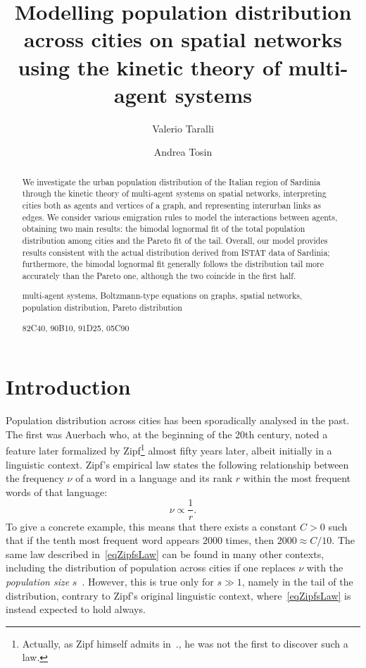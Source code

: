 \documentclass[a4paper]{article}
\title{Modelling population distribution across cities on spatial networks using the kinetic theory of multi-agent systems}
\author{Valerio Taralli}
\author{Andrea Tosin}
\affil{{\small Department of Mathematical Sciences ``G. L. Lagrange'', Politecnico di Torino, Italy}}
\date{}
\begin{document}
\maketitle
	
\begin{abstract}
We investigate the urban population distribution of the Italian region of Sardinia through the kinetic theory of multi-agent systems on spatial networks, interpreting cities both as agents and vertices of a graph, and representing interurban links as edges. We consider various emigration rules to model the interactions between agents, obtaining two main results: the bimodal lognormal fit of the total population distribution among cities and the Pareto fit of the tail. Overall, our model provides results consistent with the actual distribution derived from ISTAT data of Sardinia; furthermore, the bimodal lognormal fit generally follows the distribution tail more accurately than the Pareto one, although the two coincide in the first half.

\medskip

 multi-agent systems, Boltzmann-type equations on graphs, spatial networks, population distribution, Pareto distribution

\medskip

 82C40, 90B10, 91D25, 05C90
\end{abstract}

\section{Introduction}
\label{secIntroduction}
%
Population distribution across cities has been sporadically analysed in the past. The first was Auerbach \cite{Auerbach1913} who, at the beginning of the 20th century, noted a feature later formalized by Zipf\footnote{Actually, as Zipf himself admits in~\cite{Zipf2016}., he was not the first to discover such a law.} \cite{Zipf2016} almost fifty years later, albeit initially in a linguistic context. Zipf's empirical law states the following relationship between the frequency $\nu$ of a word in a language and its rank $r$ within the most frequent words of that language:
\begin{equation}
    \nu\propto\frac{1}{r}.
    \label{eqZipfsLaw}
\end{equation}
To give a concrete example, this means that there exists a constant $C>0$ such that if the tenth most frequent word appears $2000$ times, then $2000\approx C/10$. The same law described in~\eqref{eqZipfsLaw} can be found in many other contexts, including the distribution of population across cities if one replaces $\nu$ with the \textit{population size} $s$~\cite[Fig. 9-2]{Zipf2016}. However, this is true only for $s\gg 1$, namely in the tail of the distribution, contrary to Zipf's original linguistic context, where~\eqref{eqZipfsLaw} is instead expected to hold always.
        
\end{document}
